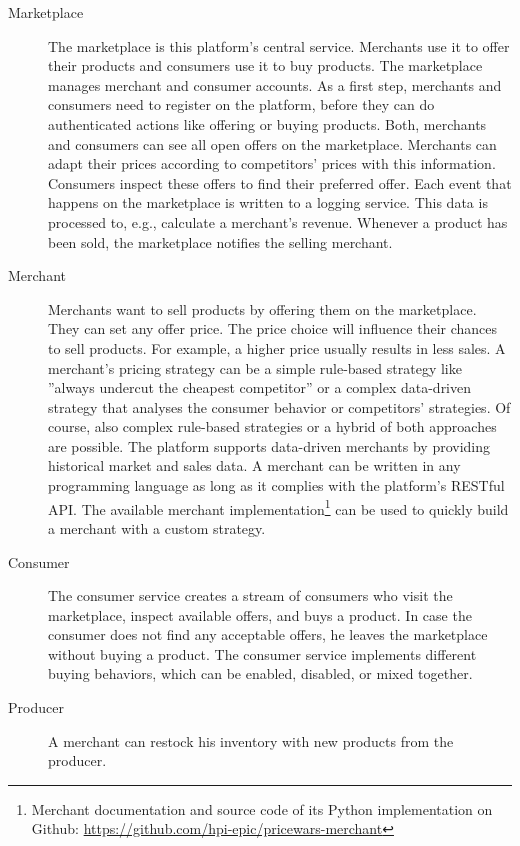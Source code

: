 
\begin{description}
	\item [Marketplace]
		The marketplace is this platform's central service.
		Merchants use it to offer their products and consumers use it to buy products.
		The marketplace manages merchant and consumer accounts.
		As a first step, merchants and consumers need to register on the platform, before they can do authenticated actions like offering or buying products.
		Both, merchants and consumers can see all open offers on the marketplace.
		Merchants can adapt their prices according to competitors' prices with this information.
		Consumers inspect these offers to find their preferred offer.
		Each event that happens on the marketplace is written to a logging service.
		This data is processed to, e.g., calculate a merchant's revenue.
		Whenever a product has been sold, the marketplace notifies the selling merchant.
	\item [Merchant]
		Merchants want to sell products by offering them on the marketplace.
		They can set any offer price.
		The price choice will influence their chances to sell products.
		For example, a higher price usually results in less sales.
		A merchant's pricing strategy can be a simple rule-based strategy like ''always undercut the cheapest competitor'' or a complex data-driven strategy that analyses the consumer behavior or competitors' strategies.
		Of course, also complex rule-based strategies or a hybrid of both approaches are possible.
		The \pricewars platform supports data-driven merchants by providing historical market and sales data.
		A merchant can be written in any programming language as long as it complies with the platform's RESTful API.
		The available merchant implementation\footnote{\pricewars Merchant documentation and source code of its Python implementation on Github: \url{https://github.com/hpi-epic/pricewars-merchant}} can be used to quickly build a merchant with a custom strategy.
	\item [Consumer]
		The consumer service creates a stream of consumers who visit the marketplace, inspect available offers, and buys a product.
		In case the consumer does not find any acceptable offers, he leaves the marketplace without buying a product.
		The consumer service implements different buying behaviors, which can be enabled, disabled, or mixed together.
	\item [Producer]
		A merchant can restock his inventory with new products from the producer.

\end{description}
